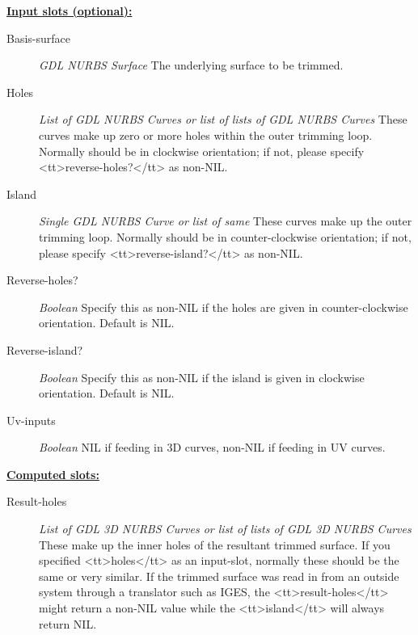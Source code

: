 \documentclass [11pt]{book}
\begin{document}
\begin{itemize}
\begin{figure}
\end{figure}





\textbf{
\underline{Input slots (optional):}}

\begin{description}

\item [Basis-surface]
\emph{GDL NURBS Surface} The underlying surface to be trimmed.


\item [Holes]
\emph{List of GDL NURBS Curves or list of lists of GDL NURBS Curves} These curves make up zero or more holes within the outer trimming loop.
Normally should be in clockwise orientation; if not, please specify <tt>reverse-holes?</tt> as non-NIL.


\item [Island]
\emph{Single GDL NURBS Curve or list of same} These curves make up the outer trimming loop. Normally should
be in counter-clockwise orientation; if not, please specify <tt>reverse-island?</tt> as non-NIL.


\item [Reverse-holes?]
\emph{Boolean} Specify this as non-NIL if the holes are given in counter-clockwise orientation. Default is NIL.


\item [Reverse-island?]
\emph{Boolean} Specify this as non-NIL if the island is given in clockwise orientation. Default is NIL.


\item [Uv-inputs]
\emph{Boolean} NIL if feeding in 3D curves, non-NIL if feeding in UV curves.


\end{description}






\textbf{
\underline{Computed slots:}}

\begin{description}

\item [Result-holes]
\emph{List of GDL 3D NURBS Curves or list of lists of GDL 3D NURBS Curves} These make up the inner holes of the resultant
trimmed surface. If you specified <tt>holes</tt> as an input-slot, normally these should be the same
or very similar. If the trimmed surface was read in from an outside system through a translator such as IGES,
the <tt>result-holes</tt> might return a non-NIL value while the <tt>island</tt> will always return NIL.



\end{description}
\end{itemize}
\end{document}
